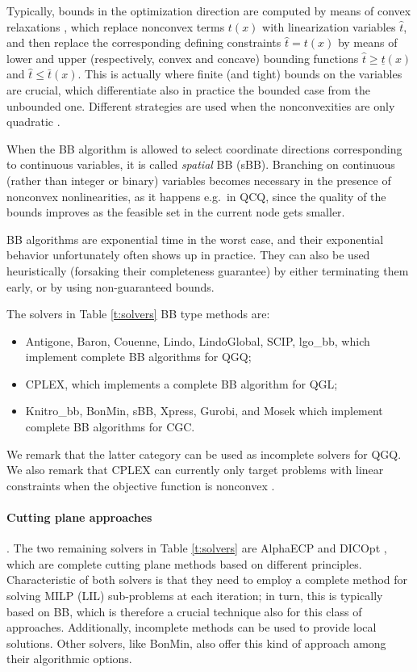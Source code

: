Typically, bounds in the optimization direction are computed by means of convex relaxations \cite{mccormick,couenne}, which replace nonconvex terms $t(x)$ with linearization variables $\hat{t}$, and then replace the corresponding defining constraints $\hat{t} = t(x)$ by means of lower and upper (respectively, convex and concave) bounding functions $\hat{t} \ge \underline{t}(x)$ and $\hat{t} \le\bar{t}(x)$. This is actually where finite (and tight) bounds on the variables are crucial, which differentiate also in practice the bounded case from the unbounded one. Different strategies are used when the nonconvexities are only quadratic \cite{glomiqo,bliek}.

When the BB algorithm is allowed to select coordinate directions corresponding to continuous variables, it is called {\it spatial} BB (sBB). Branching on continuous (rather than integer or binary) variables becomes necessary in the presence of nonconvex nonlinearities, as it happens e.g.~in QCQ, since the quality of the bounds improves as the feasible set in the current node gets smaller.

BB algorithms are exponential time in the worst case, and their exponential behavior unfortunately often shows up in practice. They can also be used heuristically (forsaking their completeness guarantee) by either terminating them early, or by using non-guaranteed bounds.

The solvers in Table \ref{t:solvers} BB type methods are:
%
\begin{itemize}
 \item {\sc Antigone}, {\sc Baron}, {\sc Couenne}, {\sc Lindo}, {\sc LindoGlobal}, {\sc SCIP}, {\sc lgo\_bb}, which implement complete BB algorithms for QGQ;
\item {\sc CPLEX}, which implements a complete BB algorithm for QGL;
%
 \item {\sc Knitro\_bb}, {\sc BonMin}, {\sc sBB}, {\sc Xpress}, {\sc Gurobi}, and {\sc Mosek} which implement complete BB algorithms for CGC.
\end{itemize}
%
We remark that the latter category can be used as incomplete solvers for QGQ. We also remark that CPLEX can currently only target problems with linear constraints when the objective function is nonconvex \cite{bliek}.

\paragraph{Cutting plane approaches}.
%
The two remaining solvers in Table \ref{t:solvers} are {\sc AlphaECP} \cite{westerlund} and {\sc DICOpt} \cite{quesada}, which are complete cutting plane methods based on different principles. Characteristic of both solvers is that they need to employ a complete method for solving MILP (LIL) sub-problems at each iteration; in turn, this is typically based on BB, which is therefore a crucial technique also for this class of approaches. Additionally, incomplete methods can be used to provide local solutions. Other solvers, like {\sc BonMin}, also offer this kind of approach among their algorithmic options.

